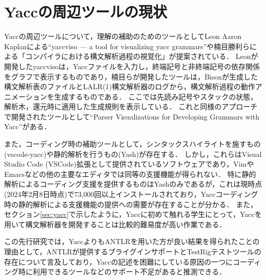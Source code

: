 \documentclass[fontsize=9bp,twocolumn,column_gap=2.36zw,a4paper,report]{jlreq}
\begin{document}
\section{Yaccの周辺ツールの現状}\label{sec:yacc_tools}

Yaccの周辺ツールについて，理解の補助のためのツールとしてLeon Aaron Kaplanによる``yaccviso — a tool for visualizing yacc grammars''\cite{yaccviso}や楠目勝利らによる「コンパイラにおける構文解析過程の視覚化」\cite{parserviso}が提案されている．
Leonが開発したyaccvisoは，Yaccファイルを入力し，終端記号と非終端記号の依存関係をグラフで表示するものであり，楠目らが開発したツールは，Bisonが生成した構文解析表のファイルとLALR(1)構文解析器のログから，構文解析過程の動作アニメーションを生成するものである．
ここでは先読み記号やスタックの状態，解析木，還元時に適用した生成規則を表示している．
これと同様のアプローチで開発されたツールとして``Parser Visualizations for Developing Grammars with Yacc''\cite{parserviso2}がある．\par
また，コーディング時の補助ツールとして，シンタックスハイライトを施すもの(vscode-yacc\cite{vscode-yacc})や静的解析を行うもの(Yash\cite{yash})が存在する．
しかし，これらはVisual Studio Code (VSCode)拡張として提供されているソフトウェアであり，VimやEmacsなどの他の主要なエディタでは同等の支援機能が得られない．
特に静的解析によるコーディング支援を提供するものはYashのみであるが，これは現時点(2024年2月8日時点)で73,000回以上インストールされており，Yaccコーディング時の静的解析による支援機能の提供への需要が存在することが分かる．
また，セクション\ref{sec:yacc}で示したように，Yaccに初めて触れる学生にとって，Yaccを用いて構文解析器を開発することは比較的難易度が高い作業である．

\begin{figure}[h]
\end{figure}

この先行研究では，YaccよりもANTLRを用いた方が良い結果を得られたことの理由として，ANTLRが提供するプライグインサポートとTestRigテストツールの存在について言及しており，Yaccの記述を困難にしている原因の一つにコーディング時に利用できるツールなどのサポート不足があると推測できる．
\end{document}
